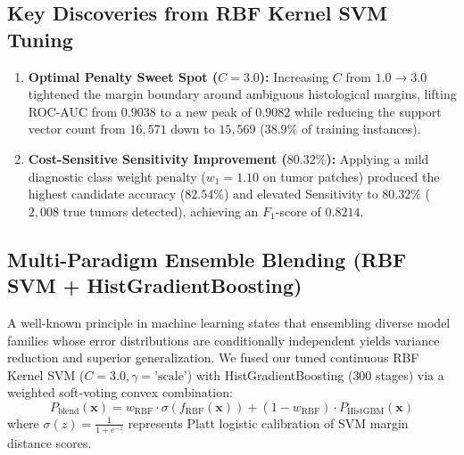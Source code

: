 \documentclass[11pt,a4paper]{article}
\begin{document}
\subsection{Key Discoveries from RBF Kernel SVM Tuning}
\begin{enumerate}[leftmargin=*]
    \item \textbf{Optimal Penalty Sweet Spot ($C=3.0$):} Increasing $C$ from $1.0 \to 3.0$ tightened the margin boundary around ambiguous histological margins, lifting ROC-AUC from $0.9038$ to a new peak of $\mathbf{0.9082}$ while reducing the support vector count from $16,571$ down to $15,569$ ($38.9\%$ of training instances).
    \item \textbf{Cost-Sensitive Sensitivity Improvement ($\mathbf{80.32\%}$):} Applying a mild diagnostic class weight penalty ($w_1 = 1.10$ on tumor patches) produced the highest candidate accuracy ($\mathbf{82.54\%}$) and elevated Sensitivity to $\mathbf{80.32\%}$ ($2,008$ true tumors detected), achieving an $F_1$-score of $\mathbf{0.8214}$.
\end{enumerate}

\subsection{Multi-Paradigm Ensemble Blending (RBF SVM + HistGradientBoosting)}
A well-known principle in machine learning states that ensembling diverse model families whose error distributions are conditionally independent yields variance reduction and superior generalization. We fused our tuned continuous RBF Kernel SVM ($C=3.0, \gamma=\text{'scale'}$) with HistGradientBoosting ($300$ stages) via a weighted soft-voting convex combination:
\begin{equation}
    P_{\text{blend}}(\mathbf{x}) = w_{\text{RBF}} \cdot \sigma(f_{\text{RBF}}(\mathbf{x})) + (1 - w_{\text{RBF}}) \cdot P_{\text{HistGBM}}(\mathbf{x})
\end{equation}
where $\sigma(z) = \frac{1}{1 + e^{-z}}$ represents Platt logistic calibration of SVM margin distance scores.
\end{document}
